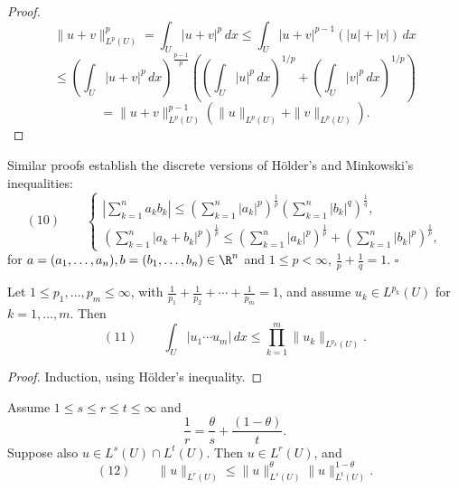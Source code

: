 \begin{proof}
$$\|u + v\|_{L^p(U)}^p = \int_U |u + v|^p\,dx \leq \int_U |u + v|^{p-1}(|u| + |v|) \, dx$$
$$\leq \left(\int_U |u + v|^p\,dx\right)^{\frac{p-1}{p}} \left(\left(\int_U |u|^p\,dx\right)^{1/p} + \left(\int_U |v|^p\,dx\right)^{1/p}\right)$$
$$= \|u + v\|_{L^p(U)}^{p-1}(\|u\|_{L^p(U)} + \|v\|_{L^p(U)}).$$
\end{proof}

\begin{remark}
\label{rem:discrete-holder-minkowski-inequalities}
Similar proofs establish the discrete versions of Hölder's and Minkowski's inequalities:
$$(10) \qquad \begin{cases}
\left|\sum_{k=1}^n a_k b_k\right| \leq \left(\sum_{k=1}^n |a_k|^p\right)^{\frac{1}{p}} \left(\sum_{k=1}^n |b_k|^q\right)^{\frac{1}{q}}, \\
\left(\sum_{k=1}^n |a_k + b_k|^p\right)^{\frac{1}{p}} \leq \left(\sum_{k=1}^n |a_k|^p\right)^{\frac{1}{p}} + \left(\sum_{k=1}^n |b_k|^p\right)^{\frac{1}{p}},
\end{cases}$$
for $a = (a_1,\ldots,a_n), b = (b_1,\ldots,b_n) \in \R^n$ and $1 \leq p < \infty$, $\frac{1}{p} + \frac{1}{q} = 1$. $\square$
\end{remark}

\begin{lemma}
\label{lem:general-holder-inequality}
Let $1 \leq p_1,\ldots,p_m \leq \infty$, with $\frac{1}{p_1} + \frac{1}{p_2} + \cdots + \frac{1}{p_m} = 1$, and assume $u_k \in L^{p_k}(U)$ for $k = 1,\ldots,m$. Then
$$(11) \qquad \int_U |u_1 \cdots u_m| \, dx \leq \prod_{k=1}^m \|u_k\|_{L^{p_k}(U)}.$$
\end{lemma}

\begin{proof}
Induction, using Hölder's inequality.
\end{proof}

\begin{lemma}
\label{lem:interpolation-inequality-lp-norms}
Assume $1 \leq s \leq r \leq t \leq \infty$ and
$$\frac{1}{r} = \frac{\theta}{s} + \frac{(1-\theta)}{t}.$$
Suppose also $u \in L^s(U) \cap L^t(U)$. Then $u \in L^r(U)$, and
$$(12) \qquad \|u\|_{L^r(U)} \leq \|u\|_{L^s(U)}^\theta \|u\|_{L^t(U)}^{1-\theta}.$$
\end{lemma}

